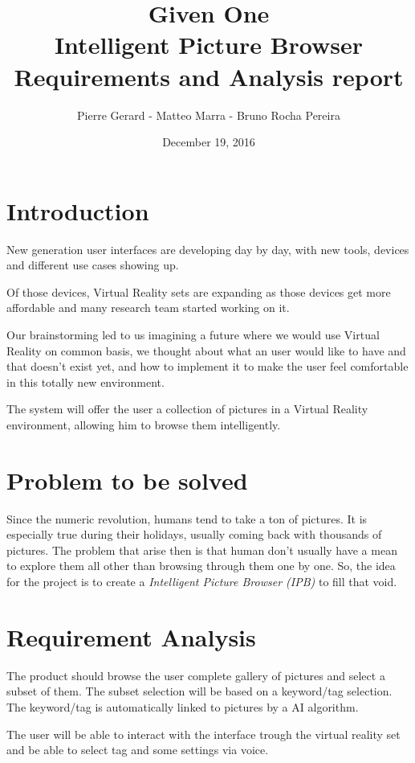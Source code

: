 \documentclass[11pt,a4paper]{article}
\author{Pierre Gerard - Matteo Marra - Bruno Rocha Pereira}
\title{Given One \\ Intelligent Picture Browser \\ Requirements and Analysis report}
\date{December 19, 2016}
\begin{document}
\maketitle

\section{Introduction}

New generation user interfaces are developing day by day, with new tools, devices and different use cases showing up.

Of those devices, Virtual Reality sets are expanding as those devices get more affordable and many research team started working on it. 

Our brainstorming led to us imagining a future where we would use Virtual Reality on common basis, we thought about what an user would like to have and that doesn't exist yet, and how to implement it to make the user feel comfortable in this totally new environment. 

The system will offer the user a collection of pictures in a Virtual Reality environment, allowing him to browse them intelligently.

\section{Problem to be solved}

Since the numeric revolution, humans tend to take a ton of pictures. It is especially true during their holidays, usually coming back with thousands of pictures. The problem that arise then is that human don't usually have a mean to explore them all other than browsing through them one by one. So, the idea for the project is to create a \textit{Intelligent Picture Browser (IPB)} to fill that void.

\section{Requirement Analysis}

The product should browse the user complete gallery of pictures and select a subset of them. The subset selection will be based on a keyword/tag selection. The keyword/tag is automatically linked to pictures by a AI algorithm.

The user will be able to interact with the interface trough the virtual reality set and be able to select tag and some settings via voice.
\end{document}
